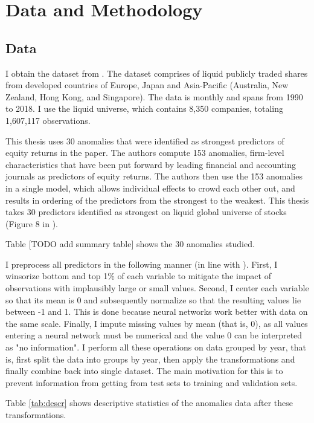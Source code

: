 \chapter{Data and Methodology}
\label{chap:met}

\section{Data}

	I obtain the dataset from \cite{tobek2020does}. The dataset comprises of liquid publicly traded shares from developed countries of Europe, Japan and Asia-Pacific (Australia, New Zealand, Hong Kong, and Singapore). The data is monthly and spans from 1990 to 2018. I use the liquid universe, which contains 8,350 companies,  totaling 1,607,117 observations. 
	
	This thesis uses 30 anomalies that were identified as strongest predictors of equity returns in the \cite{tobek2020does} paper. The authors compute 153  anomalies, firm-level characteristics that have been put forward by leading financial and accounting journals as predictors of equity returns. The authors then use the 153 anomalies in a single model, which allows individual effects to crowd each other out, and results in ordering of the predictors from the strongest to the weakest. This thesis takes 30 predictors identified as strongest on liquid global universe of stocks (Figure 8 in \cite{tobek2020does}).
	
	Table [TODO add summary table] shows the 30 anomalies studied. 
	
	I preprocess all predictors in the following manner (in line with \cite{gu2020empirical}). First, I winsorize bottom and top 1\% of each variable to mitigate the impact of observations with implausibly large or small values. Second, I center each variable so that its mean is 0 and subsequently normalize so that the resulting values lie between -1 and 1. This is done because neural networks work better with data on the same scale. Finally, I impute missing values by mean (that is, 0), as all values entering a neural network must be numerical and the value 0 can be interpreted as "no information". I perform all these operations on data grouped by year, that is, first split the data into groups by year, then apply the transformations and finally combine back into single dataset. The main motivation for this is to prevent information from getting from test sets to training and validation sets.    	
	
	Table \ref{tab:descr} shows descriptive statistics of the anomalies data after these transformations.
		
